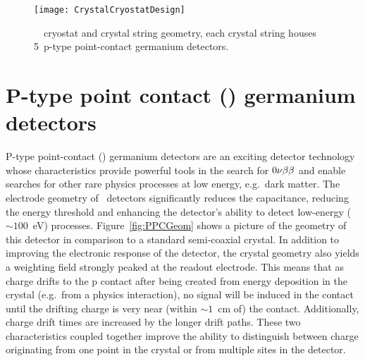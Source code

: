 		\begin{figure}
			\centering		
			\def\figheight{0.45\textheight}
			\texttt{[image: CrystalCryostatDesign]}
			\caption[\MJ~\minmod~cryostat and crystal string geometry]{\MJ~\minmod~cryostat and crystal string geometry, each
			crystal string houses 5~p-type point-contact germanium detectors.}
			\label{fig:MJEngDrawing1}
		\end{figure}

	
	\section{P-type point contact (\ppc) germanium detectors}
	\label{sec:PPCDets}

  P-type point-contact (\ppc) germanium detectors are an exciting detector
technology whose characteristics provide powerful tools in the search for
$0 \nu \beta \beta$ and enable searches for other rare physics processes at low energy, e.g.~dark matter.  
The electrode geometry of \ppc~detectors significantly reduces the
capacitance, reducing the energy threshold and enhancing the detector's
ability to detect low-energy ($\sim100$~eV) processes.  Figure~\ref{fig:PPCGeom} shows a picture of the geometry of this detector in comparison to a standard semi-coaxial crystal.  In addition to improving the electronic response of the detector, the crystal geometry also yields a weighting field strongly peaked at the readout electrode.  This means that as charge drifts to the p contact after being created from energy deposition in the crystal (e.g.~from a physics interaction), no signal will be induced in the contact until the drifting charge is very near (within $\sim1$~cm of) the contact.  Additionally, charge drift times are increased by the longer drift paths.  These two characteristics coupled together improve the ability to distinguish between charge originating from one point in the crystal or from multiple sites in the detector.

